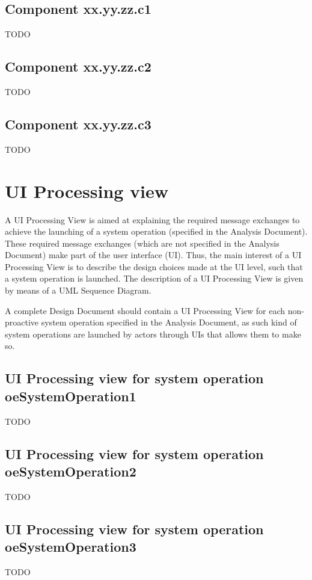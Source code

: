 \subsection{Component xx.yy.zz.c1}
TODO

\subsection{Component xx.yy.zz.c2}
TODO

\subsection{Component xx.yy.zz.c3}
TODO





\section{UI Processing view}
A \gls{UI Processing View} is aimed at explaining the required message exchanges
to achieve the launching of a system operation (specified in the \msrmessir
Analysis Document). These required message exchanges (which are not specified in
the \msrmessir Analysis Document) make part of the user interface (UI). Thus, the
main interest of a UI Processing View is to describe the design choices made
at the UI level, such that a system operation is launched. The description
of a UI Processing View is given by means of a UML Sequence Diagram. 


A complete Design Document should contain a UI Processing View for each
non-proactive system operation specified in the \msrmessir Analysis Document, as
such kind of system operations are launched by actors through UIs that allows
them to make so. 



\subsection{UI Processing view for system operation oeSystemOperation1}
TODO

 
\subsection{UI Processing view for system operation oeSystemOperation2}
TODO


\subsection{UI Processing view for system operation oeSystemOperation3}
TODO





